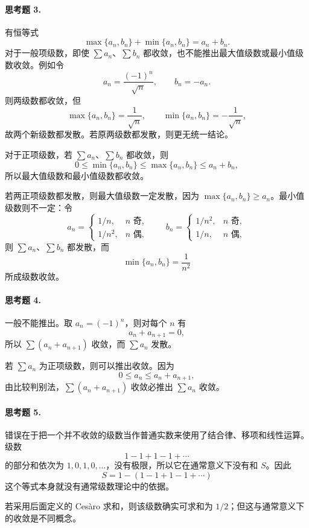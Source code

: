 \paragraph{思考题 3.}
\begin{xsolution}
有恒等式
\[
 \max\{a_n,b_n\}+\min\{a_n,b_n\}=a_n+b_n.
\]
对于一般项级数，即使 $\sum a_n$、$\sum b_n$ 都收敛，也不能推出最大值级数或最小值级数收敛。例如令
\[
 a_n=\frac{(-1)^n}{\sqrt n},\qquad b_n=-a_n.
\]
则两级数都收敛，但
\[
 \max\{a_n,b_n\}=\frac1{\sqrt n},\qquad
 \min\{a_n,b_n\}=-\frac1{\sqrt n},
\]
故两个新级数都发散。若原两级数都发散，则更无统一结论。

对于正项级数，若 $\sum a_n$、$\sum b_n$ 都收敛，则
\[
 0\leq\min\{a_n,b_n\}\leq\max\{a_n,b_n\}\leq a_n+b_n,
\]
所以最大值级数和最小值级数都收敛。

若两正项级数都发散，则最大值级数一定发散，因为 $\max\{a_n,b_n\}\geq a_n$。最小值级数则不一定：令
\[
 a_n=\begin{cases}1/n,&n\text{ 奇},\\1/n^2,&n\text{ 偶},\end{cases}
 \qquad
 b_n=\begin{cases}1/n^2,&n\text{ 奇},\\1/n,&n\text{ 偶},\end{cases}
\]
则 $\sum a_n$、$\sum b_n$ 都发散，而
\[
 \min\{a_n,b_n\}=\frac1{n^2}
\]
所成级数收敛。
\end{xsolution}

\paragraph{思考题 4.}
\begin{xsolution}
一般不能推出。取 $a_n=(-1)^n$，则对每个 $n$ 有
\[
 a_n+a_{n+1}=0,
\]
所以 $\sum(a_n+a_{n+1})$ 收敛，而 $\sum a_n$ 发散。

若 $\sum a_n$ 为正项级数，则可以推出收敛。因为
\[
 0\leq a_n\leq a_n+a_{n+1},
\]
由比较判别法，$\sum(a_n+a_{n+1})$ 收敛必推出 $\sum a_n$ 收敛。
\end{xsolution}

\paragraph{思考题 5.}
\begin{xsolution}
错误在于把一个并不收敛的级数当作普通实数来使用了结合律、移项和线性运算。级数
\[
 1-1+1-1+\cdots
\]
的部分和依次为 $1,0,1,0,\ldots$，没有极限，所以它在通常意义下没有和 $S$。因此
\[
 S=1-(1-1+1-1+\cdots)
\]
这个等式本身就没有通常级数理论中的依据。

若采用后面定义的 Cesàro 求和，则该级数确实可求和为 $1/2$；但这与通常意义下的收敛是不同概念。
\end{xsolution}

